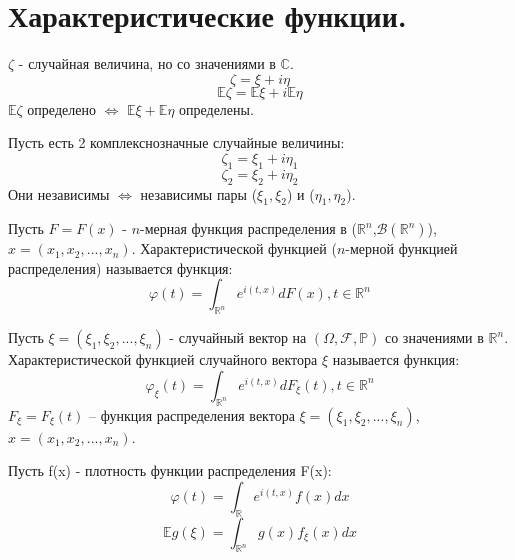 \documentclass{article}
\newcommand{\E}{\mathbb{E}}
\begin{document}
\section{Характеристические функции.}
$\zeta$ - случайная величина, но со значениями в $\mathbb {C}$.
$$\zeta = \xi + i\eta$$
$$\E\zeta = \E\xi + i\E\eta$$
$\mathbb {E}\zeta$ определено $\Longleftrightarrow$ $\mathbb {E}\xi + \mathbb {E}\eta$ определены.

\Def Пусть есть 2 комплекснозначные случайные величины:
$$\zeta_1 = \xi_1 + i\eta_1$$
$$\zeta_2 = \xi_2 + i\eta_2$$
Они независимы $\Longleftrightarrow$ независимы пары ($\xi_1, \xi_2$) и ($\eta_1, \eta_2$).

\Def Пусть $ F = F(x)$ - $n$-мерная функция распределения в ($\mathbb {R}^n$,$\mathcal B(\mathbb {R}^n)$), $x = (x_1, x_2, ..., x_n)$. \newline
Характеристической функцией 
($n$-мерной функцией распределения) называется функция:
$$\varphi(t) = \int_{\mathbb {R}^n} e^{i(t,x)}d{F(x)}, t \in \mathbb {R}^n$$

\Def  Пусть $\xi = (\xi_1, \xi_2, ..., \xi_n)$ - случайный вектор на $(\Omega, \mathcal{F}, \mathbb{P})$ со значениями в $\mathbb {R}^n$. Характеристической функцией случайного вектора $\xi$ называется функция: 
$$\varphi_{\xi}(t)  = \int_{\mathbb {R}^n} e^{i(t,x)}d{F_{\xi}(t)}, t \in \mathbb {R}^n$$
$F_{\xi} = F_{\xi}(t)$ -- функция распределения вектора $\xi = (\xi_1, \xi_2, ..., \xi_n)$, $x = (x_1, x_2, ..., x_n)$.

\noindent Пусть f(x) - плотность функции распределения F(x):
$$\varphi(t)  = \int_{\mathbb {R}} e^{i(t,x)}f(x)d{x}$$
$$\mathbb {E}g(\xi)  = \int_{\mathbb {R}^n} g(x)f_{\xi}(x)d{x}$$
\end{document}

